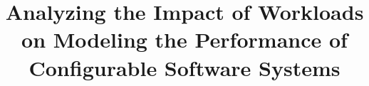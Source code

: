 \documentclass[10pt,conference]{IEEEtran}
\begin{document}
	
	\title{
		Analyzing the Impact of Workloads on Modeling the Performance of Configurable Software Systems
	}

	
	
	\maketitle

	
	
	
	
	
\end{document}
